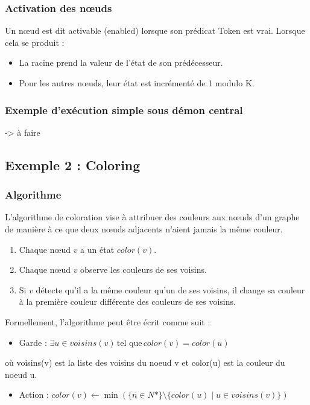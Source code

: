 \documentclass[11pt]{article}
\begin{document}
\subsubsection{Activation des nœuds}
\label{sec:org29a9b45}
Un nœud est dit activable (enabled) lorsque son prédicat Token est vrai. Lorsque cela se produit :
\begin{itemize}
\item La racine prend la valeur de l'état de son prédécesseur.
\item Pour les autres nœuds, leur état est incrémenté de 1 modulo K.
\end{itemize}

\subsubsection{Exemple d'exécution simple sous démon central}
\label{sec:org94566f5}

-> à faire

\subsection{Exemple 2 : Coloring}
\label{sec:org79c4867}

\subsubsection{Algorithme}
\label{sec:orgcc6dbaa}
L'algorithme de coloration vise à attribuer des couleurs aux nœuds d'un graphe de manière à ce que deux nœuds adjacents n'aient jamais la même couleur. 

\begin{enumerate}
\item Chaque nœud \(v\) a un état  \(color(v)\).
\item Chaque nœud \(v\) observe les couleurs de ses voisins.
\item Si \(v\) détecte qu'il a la même couleur qu'un de ses voisins, il change sa couleur à la première couleur différente des couleurs de ses voisins.
\end{enumerate}

Formellement, l'algorithme peut être écrit comme suit :
\begin{itemize}
\item Garde : \(\exists u \in voisins(v) \, \text{tel que} \, color(v) = color(u)\)
\end{itemize}
où voisins(v) est la liste des voisins du noeud v et color(u) est la couleur du noeud u.
\begin{itemize}
\item Action : \(color(v) \leftarrow \min(\{n \in N* \} \setminus \{color(u) \mid u \in voisins(v)\})\)
\end{itemize}
\end{document}
